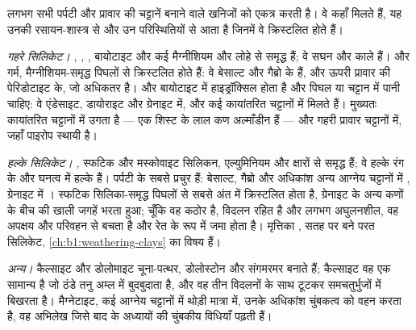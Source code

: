  लगभग सभी पर्पटी और प्रावार की चट्टानें बनाने वाले खनिजों को एकत्र करती है।
वे कहाँ मिलते हैं, यह उनकी रसायन-शास्त्र से और उन परिस्थितियों से आता है जिनमें वे क्रिस्टलित होते हैं।

\emph{गहरे सिलिकेट।} , , , बायोटाइट और कई  मैग्नीशियम और लोहे से समृद्ध हैं; वे
सघन और काले हैं।  और  गर्म, मैग्नीशियम-समृद्ध पिघलों से क्रिस्टलित होते हैं: वे बेसाल्ट और गैब्रो
के  हैं, और ऊपरी प्रावार की पेरिडोटाइट के, जो अधिकतर  है।  और बायोटाइट में हाइड्रॉक्सिल होता है
और पिघल या चट्टान में पानी चाहिए: वे एंडेसाइट, डायोराइट और ग्रेनाइट में, और कई कायांतरित चट्टानों में मिलते हैं।
 मुख्यतः कायांतरित चट्टानों में उगता है --- एक  शिस्ट के लाल कण अल्माँडीन हैं --- और गहरी प्रावार
चट्टानों में, जहाँ पाइरोप स्थायी है।

\emph{हल्के सिलिकेट।} , स्फटिक और मस्कोवाइट सिलिकन, एल्युमिनियम और क्षारों से समृद्ध हैं; वे हल्के रंग के और
घनत्व में हल्के हैं।  पर्पटी के सबसे प्रचुर  हैं: बेसाल्ट, गैब्रो और अधिकांश अन्य आग्नेय चट्टानों में
, ग्रेनाइट में । स्फटिक सिलिका-समृद्ध पिघलों से सबसे अंत में क्रिस्टलित होता है, ग्रेनाइट
के अन्य कणों के बीच की खाली जगहें भरता हुआ; चूँकि वह कठोर है, विदलन रहित है और लगभग अघुलनशील, वह अपक्षय और
परिवहन से बचता है और रेत के रूप में जमा होता है। मृत्तिका , सतह पर बने परत सिलिकेट, \cref{ch:b1:weathering-clays}
का विषय हैं।

\emph{अन्य।} कैल्साइट और डोलोमाइट चूना-पत्थर, डोलोस्टोन और संगमरमर बनाते हैं; कैल्साइट वह एक सामान्य  है जो
ठंडे तनु अम्ल में बुदबुदाता है, और वह तीन विदलनों के साथ टूटकर समचतुर्भुजों में बिखरता है। मैग्नेटाइट, कई आग्नेय
चट्टानों में थोड़ी मात्रा में, उनके अधिकांश चुंबकत्व को वहन करता है, वह अभिलेख जिसे बाद के अध्यायों की चुंबकीय विधियाँ पढ़ती हैं।


